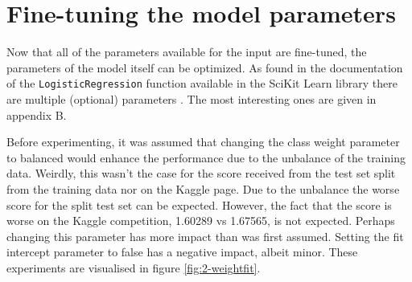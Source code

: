 \section{Fine-tuning the model parameters}
\label{section:LBM_finetuning_model}

Now that all of the parameters available for the input are fine-tuned, the parameters of the model itself can be optimized.
As found in the documentation of the \texttt{LogisticRegression} function available in the SciKit Learn library there are multiple (optional) parameters \citep{scikit_learn}.
The most interesting ones are given in appendix B. 


Before experimenting, it was assumed that changing the class weight parameter to balanced would enhance the performance due to the unbalance of the training data.
Weirdly, this wasn't the case for the score received from the test set split from the training data nor on the Kaggle page.
Due to the unbalance the worse score for the split test set can be expected.
However, the fact that the score is worse on the Kaggle competition, 1.60289 vs 1.67565, is not expected.
Perhaps changing this parameter has more impact than was first assumed.
Setting the fit intercept parameter to false has a negative impact, albeit minor.
These experiments are visualised in figure \ref{fig:2-weightfit}.

